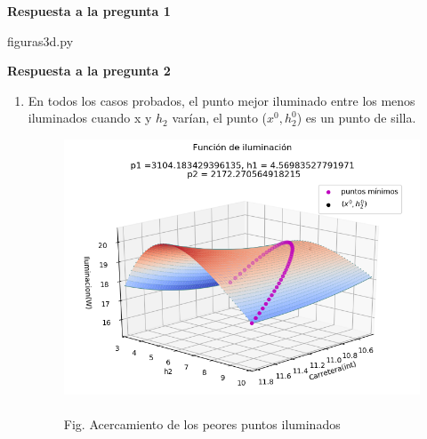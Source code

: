 \documentclass[11pt]{article}
\begin{document}
\vspace{0.5cm}
\noindent \textbf{Respuesta a la pregunta 1}

\begin{tcolorbox}[colframe=blue!35!black, title=Códigos]
figuras3d.py
\end{tcolorbox}


\vspace{0.5cm}

    \noindent \textbf{Respuesta a la pregunta 2}
    \begin{enumerate}
        \item En todos los casos probados, el punto mejor iluminado entre los menos iluminados cuando x y $h_2$ varían, el punto ($x^0,h^0_2$) es un punto de silla.

            	
            \begin{figure}[!h]	\includegraphics[keepaspectratio, width=15cm]{Imagenes/silla1.png}
            	\caption{\\Fig. Acercamiento de los peores puntos iluminados \label{fig:grafica3}}


\end{figure}
\end{enumerate}
\end{document}
